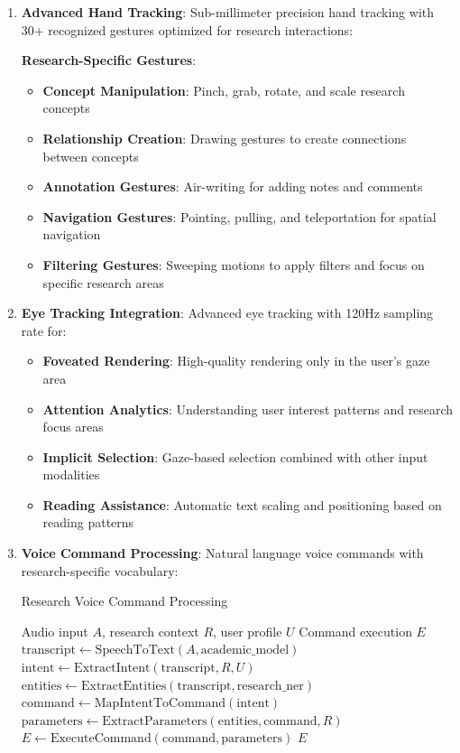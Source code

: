 \documentclass[10pt,twocolumn]{article}
\begin{document}
\begin{enumerate}
    \item \textbf{Advanced Hand Tracking}: Sub-millimeter precision hand tracking with 30+ recognized gestures optimized for research interactions:
    
    \textbf{Research-Specific Gestures}:
    \begin{itemize}
        \item \textbf{Concept Manipulation}: Pinch, grab, rotate, and scale research concepts
        \item \textbf{Relationship Creation}: Drawing gestures to create connections between concepts
        \item \textbf{Annotation Gestures}: Air-writing for adding notes and comments
        \item \textbf{Navigation Gestures}: Pointing, pulling, and teleportation for spatial navigation
        \item \textbf{Filtering Gestures}: Sweeping motions to apply filters and focus on specific research areas
    \end{itemize}
    
    \item \textbf{Eye Tracking Integration}: Advanced eye tracking with 120Hz sampling rate for:
    \begin{itemize}
        \item \textbf{Foveated Rendering}: High-quality rendering only in the user's gaze area
        \item \textbf{Attention Analytics}: Understanding user interest patterns and research focus areas
        \item \textbf{Implicit Selection}: Gaze-based selection combined with other input modalities
        \item \textbf{Reading Assistance}: Automatic text scaling and positioning based on reading patterns
    \end{itemize}
    
    \item \textbf{Voice Command Processing}: Natural language voice commands with research-specific vocabulary:
    
    \begin{algorithm}[H]
    \caption{Research Voice Command Processing}
    \label{alg:voice_processing}
    \begin{algorithmic}[1]
    \REQUIRE Audio input $A$, research context $R$, user profile $U$
    \ENSURE Command execution $E$
    \STATE $\text{transcript} \leftarrow \text{SpeechToText}(A, \text{academic\_model})$
    \STATE $\text{intent} \leftarrow \text{ExtractIntent}(\text{transcript}, R, U)$
    \STATE $\text{entities} \leftarrow \text{ExtractEntities}(\text{transcript}, \text{research\_ner})$
    \STATE $\text{command} \leftarrow \text{MapIntentToCommand}(\text{intent})$
    \STATE $\text{parameters} \leftarrow \text{ExtractParameters}(\text{entities}, \text{command}, R)$
    \STATE $E \leftarrow \text{ExecuteCommand}(\text{command}, \text{parameters})$
    \RETURN $E$
    \end{algorithmic}
    \end{algorithm}
    

\end{enumerate}
\end{document}
